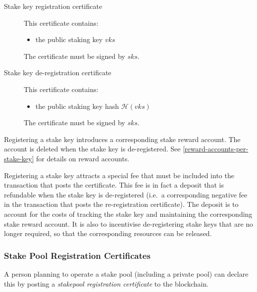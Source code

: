 \documentclass[11pt,a4paper]{article}
\begin{document}
\begin{description}
\item[Stake key registration certificate]
This certificate contains:

\begin{itemize}
\item
  the public staking key \(vks\)
\end{itemize}

The certificate must be signed by \(sks\).
\item[Stake key de-registration certificate]
This certificate contains:

\begin{itemize}
\item
  the public staking key hash \(\mathcal{H}(vks)\)
\end{itemize}

The certificate must be signed by \(sks\).
\end{description}

Registering a stake key introduces a corresponding stake reward account.
The account is deleted when the stake key is de-registered. See
\cref{reward-accounts-per-stake-key} for details on reward accounts.

Registering a stake key attracts a special fee that must be included
into the transaction that posts the certificate. This fee is in fact a
deposit that is refundable when the stake key is de-registered (i.e.~a
corresponding negative fee in the transaction that posts the
re-registration certificate). The deposit is to account for the costs of
tracking the stake key and maintaining the corresponding stake reward
account. It is also to incentivise de-registering stake keys that are no
longer required, so that the corresponding resources can be released.

\subsubsection{Stake Pool Registration Certificates}
\label{stake-pool-registration-certificates}

A person planning to operate a stake pool (including a private pool) can
declare this by posting a \emph{stakepool registration certificate} to
the blockchain.
\end{document}
